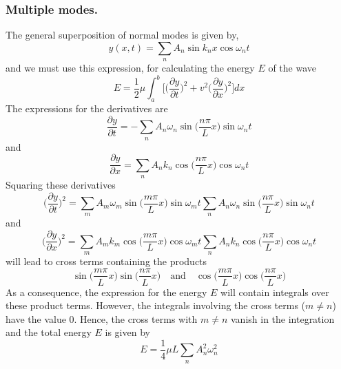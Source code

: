 \documentclass[../../../main.tex]{subfiles}
\begin{document}
\subsubsection*{Multiple modes.} The general superposition of normal modes is given by,
\begin{equation*}
    y (x, t) =\sum_{n} A_n \sin k_nx \cos \omega_nt
\end{equation*}
and we must use this expression, for calculating the energy $E$ of the wave 
\begin{equation*}
    E=\frac{1}{2}\mu\int_{a}^{b}\biggl[ \biggl(\frac{\partial y}{\partial t}\biggr)^2 + v^2 \biggl(\frac{\partial y}{\partial x}\biggr)^2\biggr]dx
\end{equation*}
The expressions for the derivatives are 
\begin{equation*}
    \frac{\partial y}{\partial t}=-\sum_n A_n \omega_n \sin \biggl(\frac{n\pi }{L}x\biggr) \sin\omega_n t
\end{equation*}
and 
\begin{equation*}
    \frac{\partial y}{\partial x}=\sum_n A_n k_n \cos \biggl(\frac{n\pi }{L}x\biggr) \cos\omega_n t
\end{equation*}
Squaring these derivatives
\begin{equation*}
    \biggl(\frac{\partial y}{\partial t}\biggr)^2= \sum_m A_m \omega_m \sin \biggl(\frac{m\pi }{L}x\biggr) \sin\omega_m t\sum_n A_n \omega_n \sin \biggl(\frac{n\pi }{L}x\biggr) \sin\omega_n t
\end{equation*}
and
\begin{equation*}
    \biggl(\frac{\partial y}{\partial x}\biggr)^2=\sum_m A_m k_m \cos \biggl(\frac{m\pi }{L}x\biggr) \cos\omega_m t\sum_n A_n k_n \cos \biggl(\frac{n\pi }{L}x\biggr) \cos\omega_n t
\end{equation*}
will lead to cross terms containing the products
\begin{equation*}
    \sin \biggl(\frac{m\pi }{L}x\biggr)\sin \biggl(\frac{n\pi }{L}x\biggr)\quad\text{and}\quad \cos \biggl(\frac{m\pi }{L}x\biggr)\cos \biggl(\frac{n\pi }{L}x\biggr)
\end{equation*}
As a consequence, the expression for the energy $E$ will contain integrals over these product terms. However, the integrals involving the cross terms ($m\neq n$) have the value 0. Hence, the cross terms with $m  \neq n$ vanish in the integration and the total energy $E$ is given by 
\begin{equation*}
    E=\frac{1}{4}\mu L\sum_n A_n^2\omega_n^2
\end{equation*}
\end{document}
